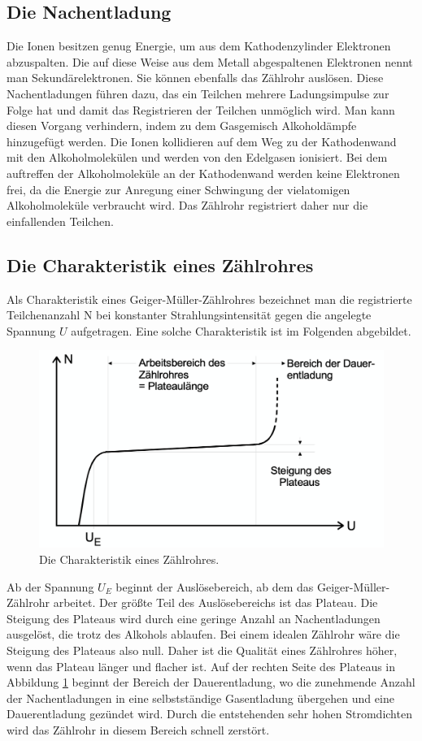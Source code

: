   \subsection{Die Nachentladung}
    Die Ionen besitzen genug Energie, um aus dem Kathodenzylinder Elektronen abzuspalten. Die auf
    diese Weise aus dem Metall abgespaltenen Elektronen nennt man Sekundärelektronen. Sie können
    ebenfalls das Zählrohr auslösen. Diese Nachentladungen führen dazu, das ein Teilchen mehrere
    Ladungsimpulse zur Folge hat und damit das Registrieren der Teilchen unmöglich wird. Man kann
    diesen Vorgang verhindern, indem zu dem Gasgemisch Alkoholdämpfe hinzugefügt werden. Die Ionen
    kollidieren auf dem Weg zu der Kathodenwand mit den Alkoholmolekülen und werden von den Edelgasen
    ionisiert. Bei dem auftreffen der Alkoholmoleküle an der Kathodenwand werden keine Elektronen frei,
    da die Energie zur Anregung einer Schwingung der vielatomigen Alkoholmoleküle verbraucht wird.
    Das Zählrohr registriert daher nur die einfallenden Teilchen.
  \subsection{Die Charakteristik eines Zählrohres}
    Als Charakteristik eines Geiger-Müller-Zählrohres bezeichnet man die registrierte Teilchenanzahl N
    bei konstanter Strahlungsintensität gegen die angelegte Spannung $U$ aufgetragen. Eine solche
    Charakteristik ist im Folgenden abgebildet.
    \begin{figure}[H]
      \centering
      \includegraphics[scale=0.6]{content/Charakteristik}
      \caption{Die Charakteristik eines Zählrohres.}
      \label{fig:charakteristik1}
    \end{figure}
    \noindent
    Ab der Spannung $U_{E}$ beginnt der Auslösebereich, ab dem das Geiger-Müller-Zählrohr arbeitet.
    Der größte Teil des Auslösebereichs ist das Plateau. Die Steigung des Plateaus wird durch eine
    geringe Anzahl an Nachentladungen ausgelöst, die trotz des Alkohols ablaufen. Bei einem idealen
    Zählrohr wäre die Steigung des Plateaus also null. Daher ist die Qualität eines Zählrohres höher,
    wenn das Plateau länger und flacher ist. Auf der rechten Seite des Plateaus in Abbildung
    \ref{fig:charakteristik1} beginnt der Bereich der Dauerentladung, wo die zunehmende Anzahl der
    Nachentladungen in eine selbstständige Gasentladung übergehen und eine Dauerentladung gezündet
    wird. Durch die entstehenden sehr hohen Stromdichten wird das Zählrohr in diesem Bereich schnell
    zerstört.
\label{sec:Theorie}
